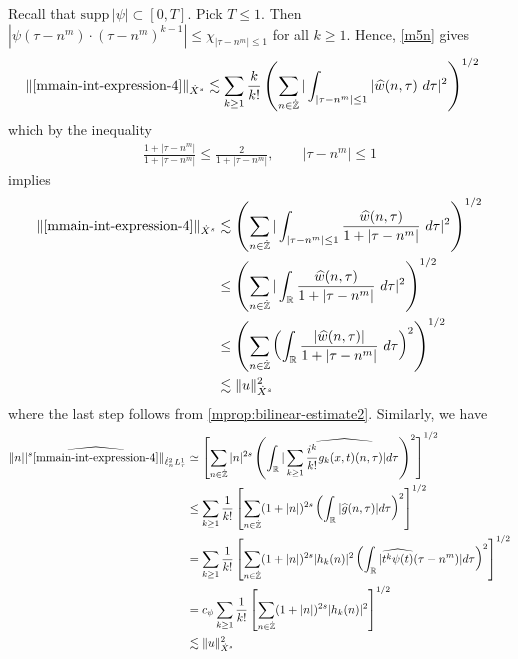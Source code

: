 Recall that $\text{supp} \, |\psi| \subset [0, T ]$. Pick $T \le 1$. 
Then $| \psi\left( \tau - n^m \right) \cdot \left( \tau - n^m \right)^{k 
-1} | \le \chi_{| \tau - n^m | \le 1}$ for all $k \ge 1$. Hence, \eqref{m5n} gives
%
\begin{equation*}
	\begin{split}
		\|\eqref{mmain-int-expression-4} \|_{\dot{X}^s} 
		& \lesssim \sum_{k \ge 1} \frac{k}{k!}  \left( \sum_{n \in \dot{\mathbb{Z}}} | 
		\int_{| \tau - n^m  |\le 1} | \widehat{w}(n, \tau) \ d \tau |^2 
		\right)^{1/2}
	\end{split}
\end{equation*}
%
which by the inequality
%
\begin{equation*}
	\begin{split}
		\frac{1 + | \tau - n^m |}{1 + | \tau  - n^m |} \le 
		\frac{2}{1 + | \tau - n^m |}, \qquad | \tau - n^m  | \le 1
	\end{split}
\end{equation*}
%
implies
%
\begin{equation}
\label{mmain-int4-est-X-s-part}
	\begin{split}
		\|\eqref{mmain-int-expression-4}\|_{\dot{X}^s}
		& \lesssim \left( \sum_{n \in \dot{\mathbb{Z}}} | \int_{| \tau - n^m| \le 1 }
		\frac{\widehat{w}(n, \tau)}{1 + | \tau - n^m |} \ d \tau |^2 
		\right)^{1/2}
		\\
		& \le \left( \sum_{n \in \dot{\mathbb{Z}}} | \int_{\mathbb{R}}
		\frac{\widehat{w}(n, \tau)}{1 + | \tau - n^m |} \ d \tau |^2 
		\right)^{1/2} \\
		& \le \left( \sum_{n \in \dot{\mathbb{Z}}} \left( \int_{\mathbb{R}} 
		\frac{|\widehat{w}(n, \tau)|}{1 + | \tau - n^m |}  \ d \tau  \right)^2
		\right)^{1/2} \\
		& \lesssim \|u\|_{\dot{X}^s}^2
	\end{split}
\end{equation}
%
where the last step follows from \cref{mprop:bilinear-estimate2}. Similarly,
we have
%
%
\begin{equation}
\label{mmain-int4-est-Y-s-part}
	\begin{split}
		\| n| |^s \widehat{\eqref{mmain-int-expression-4}}\|_{\dot{\ell}^2_n L^1_\tau}
		& \simeq \left[ \sum_{n \in
		\dot{\mathbb{Z}}}|n|^{2s} \left( \int_{\mathbb{R}} | \sum_{k \ge 1}
		\widehat{\frac{i^{k}}{k!}g_{k}(x,t)(n, \tau)} |d \tau \right)^{2} \right]^{1/2}
		\\
		& \le \sum_{k \ge 1} \frac{1}{k!} \left[ \sum_{n \in \dot{\mathbb{Z}}} (1 + | n
		|)^{2s} \left( \int_{\mathbb{R}} | \widehat{g}(n, \tau) | d \tau \right)^{2}
		\right]^{1/2}
		\\
		& = \sum_{k \ge 1} \frac{1}{k!} \left[ \sum_{n \in \dot{\mathbb{Z}}} (1 + | n
		|)^{2s} | h_{k}(n) |^2 \left( \int_{\mathbb{R}} | \widehat{t^{k} \psi(t)}(\tau -
		n^m) |d \tau \right)^{2} \right]^{1/2}
		\\
		& = c_{\psi} \sum_{k \ge 1} \frac{1}{k!} \left[ \sum_{n \in \dot{\mathbb{Z}}} (1 + | n
		|)^{2s} | h_{k}(n) |^2 \right]^{1/2}
		\\
		& \lesssim \|u\|_{\dot{X}^s}^2
	\end{split}
\end{equation}
